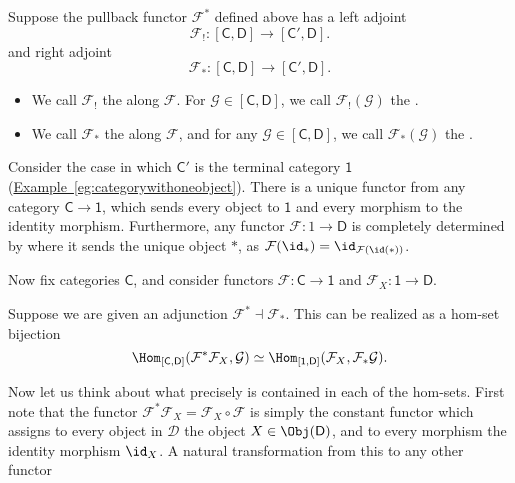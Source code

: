 \documentclass[notes.tex]{subfiles}
\begin{document}
\begin{definition}
  \label{def:kan_extension}
  Suppose the pullback functor $\mathcal{F}^{*}$ defined above has a left adjoint
  \begin{equation*}
    \mathcal{F}_{!}\colon [\mathsf{C}, \mathsf{D}] \to [\mathsf{C}', \mathsf{D}].
  \end{equation*}
  and right adjoint
  \begin{equation*}
    \mathcal{F}_{*}\colon [\mathsf{C}, \mathsf{D}] \to [\mathsf{C}', \mathsf{D}].
  \end{equation*}
  \begin{itemize}
    \item We call $\mathcal{F}_{!}$ the  along $\mathcal{F}$. For $\mathcal{\mathcal{G}} \in [\mathsf{C}, \mathsf{D}]$, we call $\mathcal{F}_{!}(\mathcal{G})$ the .

    \item We call $\mathcal{F}_{*}$ the  along $\mathcal{F}$, and for any $\mathcal{G} \in [\mathsf{C}, \mathsf{D}]$, we call $\mathcal{F}_{*}(\mathcal{G})$ the .
  \end{itemize}
\end{definition}

\begin{example}
  Consider the case in which $\mathsf{C}'$ is the terminal category $\mathsf{1}$ (\hyperref[eg:categorywithoneobject]{Example~\ref*{eg:categorywithoneobject}}). There is a unique functor from any category $\mathsf{C} \to \mathsf{1}$, which sends every object to $\mathsf{1}$ and every morphism to the identity morphism. Furthermore, any functor $\mathcal{F}\colon 1 \to \mathsf{D}$ is completely determined by where it sends the unique object $*$, as $\mathcal{F}(\id_{*}) = \id_{\mathcal{F}(\id(*))}$.

  Now fix categories $\mathsf{C}$, and consider functors $\mathcal{F}\colon \mathsf{C} \to \mathsf{1}$ and $\mathcal{F}_{X}\colon \mathsf{1} \to \mathsf{D}$.

  Suppose we are given an adjunction $\mathcal{F}^{*} \dashv \mathcal{F}_{*}$. This can be realized as a hom-set bijection
  \begin{equation*}
    \Hom_{[\mathsf{C}, \mathsf{D}]}(\mathcal{F}^{*}\mathcal{F}_{X}, \mathcal{G}) \simeq \Hom_{[\mathsf{1}, \mathsf{D}]}(\mathcal{F}_{X}, \mathcal{F}_{*}\mathcal{G}).
  \end{equation*}

  Now let us think about what precisely is contained in each of the hom-sets. First note that the functor $\mathcal{F}^{*}\mathcal{F}_{X} = \mathcal{F}_{X} \circ \mathcal{F}$ is simply the constant functor which assigns to every object in $\mathcal{D}$ the object $X \in \Obj(\mathsf{D})$, and to every morphism the identity morphism $\id_{X}$. A natural transformation from this to any other functor
\end{example}
\end{document}
